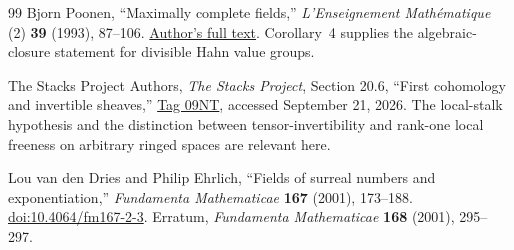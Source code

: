 \documentclass[11pt,letterpaper]{article}
\theoremstyle{definition}
\theoremstyle{remark}
\numberwithin{equation}{section}
\begin{document}
\begin{thebibliography}{99}
Bjorn Poonen,
``Maximally complete fields,''
\emph{L'Enseignement Math\'ematique} (2) \textbf{39} (1993), 87--106.
\href{https://math.mit.edu/~poonen/papers/amsval.pdf}{Author's full text}.
Corollary~4 supplies the algebraic-closure statement for divisible Hahn value groups.

The Stacks Project Authors,
\emph{The Stacks Project}, Section 20.6, ``First cohomology and invertible sheaves,''
\href{https://stacks.math.columbia.edu/tag/09NT}{Tag 09NT}, accessed September 21, 2026.
The local-stalk hypothesis and the distinction between tensor-invertibility and rank-one local freeness on arbitrary ringed spaces are relevant here.

Lou van den Dries and Philip Ehrlich,
``Fields of surreal numbers and exponentiation,''
\emph{Fundamenta Mathematicae} \textbf{167} (2001), 173--188.
\href{https://doi.org/10.4064/fm167-2-3}{doi:10.4064/fm167-2-3}.
Erratum, \emph{Fundamenta Mathematicae} \textbf{168} (2001), 295--297.

\end{thebibliography}
\end{document}
